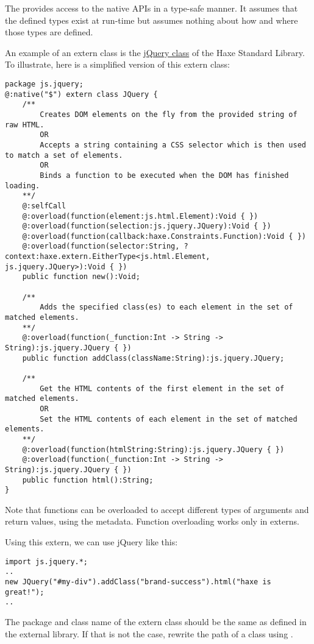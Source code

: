 The  provides access to the native APIs in a type-safe manner. It assumes that the defined types exist at run-time but assumes nothing about how and where those types are defined. 

An example of an extern class is the \href{https://github.com/HaxeFoundation/haxe/blob/development/std/js/jquery/JQuery.hx}{jQuery class} of the Haxe Standard Library. 
To illustrate, here is a simplified version of this extern class:

\begin{lstlisting}
package js.jquery;
@:native("$") extern class JQuery {
	/**
		Creates DOM elements on the fly from the provided string of raw HTML.
		OR
		Accepts a string containing a CSS selector which is then used to match a set of elements.
		OR
		Binds a function to be executed when the DOM has finished loading.
	**/
	@:selfCall
	@:overload(function(element:js.html.Element):Void { })
	@:overload(function(selection:js.jquery.JQuery):Void { })
	@:overload(function(callback:haxe.Constraints.Function):Void { })
	@:overload(function(selector:String, ?context:haxe.extern.EitherType<js.html.Element, js.jquery.JQuery>):Void { })
	public function new():Void;

	/**
		Adds the specified class(es) to each element in the set of matched elements.
	**/
	@:overload(function(_function:Int -> String -> String):js.jquery.JQuery { })
	public function addClass(className:String):js.jquery.JQuery;

	/**
		Get the HTML contents of the first element in the set of matched elements.
		OR
		Set the HTML contents of each element in the set of matched elements.
	**/
	@:overload(function(htmlString:String):js.jquery.JQuery { })
	@:overload(function(_function:Int -> String -> String):js.jquery.JQuery { })
	public function html():String;
}
\end{lstlisting}

Note that functions can be overloaded to accept different types of arguments and return values, using the  metadata. Function overloading works only in externs.

Using this extern, we can use jQuery like this:

\begin{lstlisting}
import js.jquery.*;
..
new JQuery("#my-div").addClass("brand-success").html("haxe is great!");
..
\end{lstlisting}

The package and class name of the extern class should be the same as defined in the external library. If that is not the case, rewrite the path of a class using .


